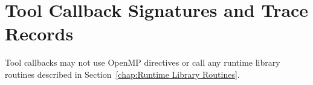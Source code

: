 %
%
%
%
%
%
%
%
%
%
%
%
%


\section{Tool Callback Signatures and Trace Records}
\label{sec:ompt-tool-callbacks}

\restrictions
Tool callbacks may not use OpenMP directives or call any runtime library routines
described in Section~\ref{chap:Runtime Library Routines}.

